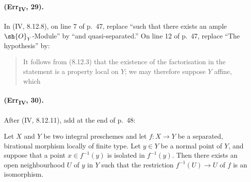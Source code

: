 \paragraph{(Err\textsubscript{IV}, 29).}
In (IV, 8.12.8), on line 7 of p.~47, replace ``such that there exists an
ample $\sh{O}_Y$-Module'' by ``and quasi-separated.''  On line 12 of
p.~47, replace ``The hypothesis'' by:
\begin{quote}
It follows from (8.12.3) that the existence of the factorisation in the
statement is a property local on $Y$; we may therefore suppose $Y$
affine, which
\end{quote}

\paragraph{(Err\textsubscript{IV}, 30).}
After (IV, 8.12.11), add at the end of p.~48:

\begin{corollary}[8.12.12]
Let $X$ and $Y$ be two integral preschemes and let $f:X\to Y$ be a
separated, birational morphism locally of finite type.  Let $y\in Y$ be
a normal point of $Y$, and suppose that a point $x\in f^{-1}(y)$ is
isolated in $f^{-1}(y)$.  Then there exists an open neighbourhood $U$
of $y$ in $Y$ such that the restriction $f^{-1}(U)\to U$ of $f$ is an
isomorphism.
\end{corollary}

